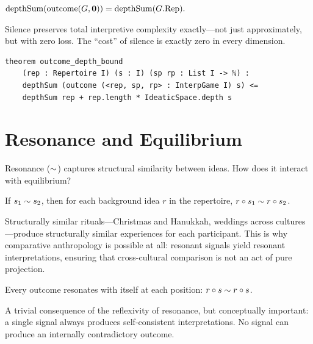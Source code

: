 \begin{theorem}
\label{thm:void-outcome-depth}
$\mathrm{depthSum}(\mathrm{outcome}(G,\mathbf{0})) = \mathrm{depthSum}(G.\mathrm{Rep}).$
\end{theorem}

Silence preserves total interpretive complexity exactly---not just
approximately, but with zero loss.  The ``cost'' of silence is exactly zero
in every dimension.

\begin{lstlisting}[caption={Outcome depth bound in Lean~4.}]
theorem outcome_depth_bound
    (rep : Repertoire I) (s : I) (sp rp : List I -> ℕ) :
    depthSum (outcome (<rep, sp, rp> : InterpGame I) s) <=
    depthSum rep + rep.length * IdeaticSpace.depth s
\end{lstlisting}


\section{Resonance and Equilibrium}
\label{sec:eq-resonance}

Resonance ($\sim$) captures structural similarity between ideas.  How does
it interact with equilibrium?

\begin{theorem}
\label{thm:resonant-signals-outcomes}
If $s_1\sim s_2$, then for each background idea $r$ in the repertoire,
$r\circ s_1 \sim r\circ s_2$.
\end{theorem}

Structurally similar rituals---Christmas and Hanukkah, weddings across
cultures---produce structurally similar experiences for each participant.
This is why comparative anthropology is possible at all: resonant signals
yield resonant interpretations, ensuring that cross-cultural comparison is
not an act of pure projection.

\begin{theorem}
\label{thm:outcome-self-resonance}
Every outcome resonates with itself at each position:
$r\circ s \sim r\circ s$.
\end{theorem}

A trivial consequence of the reflexivity of resonance, but conceptually
important: a single signal always produces self-consistent interpretations.
No signal can produce an internally contradictory outcome.

